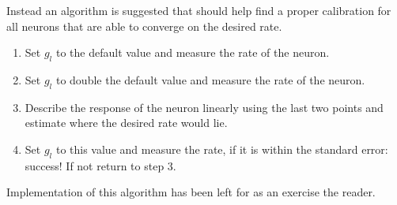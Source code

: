 \documentclass[a4paper,twocolumn]{article}
\begin{document}
Instead an algorithm is suggested that should help find a proper calibration for
all neurons that are able to converge on the desired rate.
\begin{enumerate}
    \item Set $g_l$ to the default value and measure the rate of the neuron.
    \item Set $g_l$ to double the default value and measure the rate of the
        neuron.
    \item Describe the response of the neuron linearly using the last two
        points and estimate where the desired rate would lie.
    \item Set $g_l$ to this value and measure the rate, if it is within the
        standard error: success! If not return to step 3.
\end{enumerate}
Implementation of this algorithm has been left for as an exercise the reader.
\end{document}
